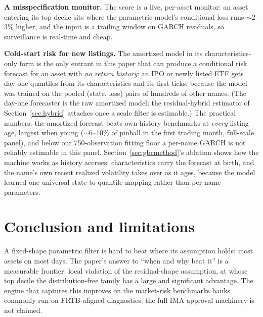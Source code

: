 \documentclass[11pt]{article}
\theoremstyle{remark}
\begin{document}
\textbf{A misspecification monitor.} The score is a live, per-asset
monitor: an asset entering its top decile sits where the parametric
model's conditional loss runs $\sim$2--3\% higher, and the input is a
trailing window on GARCH residuals, so surveillance is real-time and
cheap.

\textbf{Cold-start risk for new listings.} The amortized model in its
characteristics-only form is the
only entrant in this paper that can produce a conditional risk forecast
for an asset with \emph{no return history}: an IPO or newly listed
ETF gets day-one quantiles from its characteristics and
its first ticks, because the model was trained on the pooled
(state, loss) pairs of hundreds of other names. (The day-one forecaster is the raw amortized model; the
residual-hybrid estimator of Section~\ref{sec:hybrid} attaches once a
scale filter is estimable.) The practical numbers:
the amortized forecast beats own-history benchmarks at \emph{every}
listing age, largest when young ($\sim$6--10\% of pinball in the
first trading month, full-scale panel), and below our
750-observation fitting floor a per-name GARCH is not reliably
estimable in this panel. Section~\ref{sec:gbcmethod}'s ablation shows
how the machine works as history accrues: characteristics carry the forecast at birth, and
the name's own recent realized volatility takes over as it ages,
because the model learned one universal state-to-quantile mapping
rather than per-name parameters.


\section{Conclusion and limitations}\label{sec:limitations}

A fixed-shape parametric filter is hard to beat where its
assumption holds: most assets on most days. The paper's answer to
``when and why beat it'' is a measurable frontier: local violation of
the residual-shape assumption, at whose top decile the
distribution-free family has a large and significant advantage. The
engine that captures this improves on the market-risk benchmarks banks
commonly run on FRTB-aligned diagnostics; the full IMA approval
machinery is not claimed.
\end{document}

